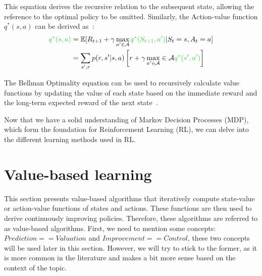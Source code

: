 \documentclass[../xlapes02]{subfiles}
\begin{document}
    This equation derives the recursive relation to the subsequent state, allowing the reference to the optimal policy to be omitted. Similarly, the Action-value function $q^*(s, a)$ can be derived as~\cite{rao2022foundations}:
    \begin{equation}
        \begin{split}
            \textcolor[RGB]{51,204,51}{q^*(s, a)} &= \mathbb{E}[R_{t+1} + \gamma \max_{a'\in\mathcal{A}} \textcolor[RGB]{51,204,51}{q^*(S_{t+1}, a')} | S_t = s, A_t = a] \\
            &= \sum_{s', r} p(r, s'|s, a) \left[r + \gamma \max_{a'\in\mathcal{A}} \in \mathcal{A} \textcolor[RGB]{51,204,51}{q^*(s', a')}  \right]
        \end{split}
    \end{equation}


    The Bellman Optimality equation can be used to recursively calculate value functions by updating the value of each state based on the immediate reward and the long-term expected reward of the next state~\cite{rao2022foundations}.

    Now that we have a solid understanding of Markov Decision Processes (MDP), which form the foundation for Reinforcement Learning (RL), we can delve into the different learning methods used in RL.


    \section{Value-based learning}\label{sec:value-based-learning}
    This section presents value-based algorithms that iteratively compute state-value or action-value functions of states and actions. These functions are then used to derive continuously improving policies. Therefore, these algorithms are referred to as value-based algorithms. First, we need to mention some concepts: $Prediction==Valuation$ and $Improvement==Control$, these two concepts will be used later in this section. However, we will try to stick to the former, as it is more common in the literature and makes a bit more sense based on the context of the topic.
\end{document}
